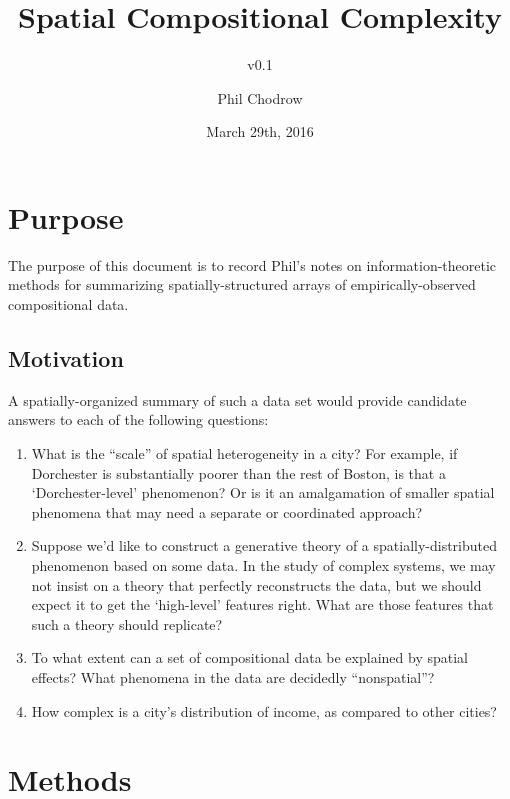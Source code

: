 \documentclass[english]{scrartcl}
\title{Spatial Compositional Complexity}
\subtitle{v0.1}
\author{Phil Chodrow}
\date{March 29th, 2016}
\begin{document}
\maketitle

\section{Purpose}
	The purpose of this document is to record Phil's notes on information-theoretic methods for summarizing spatially-structured arrays of empirically-observed compositional data. 

	\subsection{Motivation}
		A spatially-organized summary of such a data set would provide candidate answers to each of the following questions: 
		\begin{enumerate}
			\item What is the ``scale'' of spatial heterogeneity in a city? For example, if Dorchester is substantially poorer than the rest of Boston, is that a `Dorchester-level' phenomenon? Or is it an amalgamation of smaller spatial phenomena that may need a separate or coordinated approach?
			\item Suppose we'd like to construct a generative theory of a spatially-distributed phenomenon based on some data. In the study of complex systems, we may not insist on a theory that perfectly reconstructs the data, but we should expect it to get the `high-level' features right. What are those features that such a theory should replicate?
			\item To what extent can a set of compositional data be explained by spatial effects? What phenomena in the data are decidedly ``nonspatial''?
			\item How complex is a city's distribution of income, as compared to other cities?
		\end{enumerate}
\section{Methods}
\end{document}
